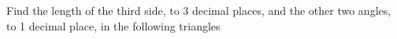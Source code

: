 \question Find the length of the third side, to 3 decimal places, 
and the other two angles, to 1 decimal place, in the following triangles
\label{q:triangle_formulae_q01}
\begin{multicols}{3}
\end{multicols}
